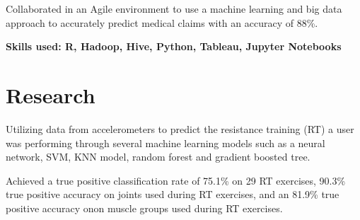 \documentclass[letterpaper]{deedy-resume} %
\begin{document}
\begin{minipage}[t]{0.66\textwidth}
\begin{tightitemize}
\item Collaborated in an Agile environment to use a machine learning and big data approach to accurately predict medical claims with an accuracy of 88\%. \item \textbf {Skills used: R, Hadoop, Hive, Python, Tableau, Jupyter Notebooks}
\end{tightitemize}

\sectionspace %






\section{\faKeyboardO \hspace{1mm} Research}



\begin{tightitemize}
\item Utilizing data from accelerometers to predict the resistance training (RT) a user was performing through several machine learning models such as a neural network, SVM, KNN model, random forest and gradient boosted tree.
\item Achieved a true positive classification rate of 75.1\% on 29 RT exercises, 90.3\% true positive accuracy on joints used during RT exercises, and an 81.9\% true positive accuracy onon muscle groups used during RT exercises. 
\end{tightitemize}


\end{minipage}
\end{document}
